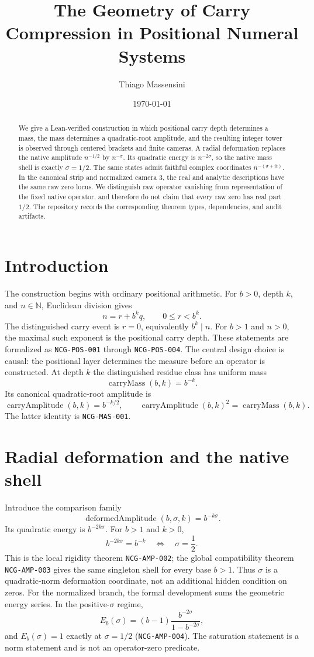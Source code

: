 \documentclass[11pt,a4paper]{article}
\title{The Geometry of Carry Compression in Positional Numeral Systems}
\author{Thiago Massensini}
\date{\today}
\begin{document}
\maketitle
\begin{abstract}
We give a Lean-verified construction in which positional carry depth determines a mass, the mass determines a quadratic-root amplitude, and the resulting integer tower is observed through centered brackets and finite cameras. A radial deformation replaces the native amplitude $n^{-1/2}$ by $n^{-\sigma}$. Its quadratic energy is $n^{-2\sigma}$, so the native mass shell is exactly $\sigma=1/2$. The same states admit faithful complex coordinates $n^{-(\sigma+it)}$. In the canonical strip and normalized camera $3$, the real and analytic descriptions have the same raw zero locus. We distinguish raw operator vanishing from representation of the fixed native operator, and therefore do not claim that every raw zero has real part $1/2$. The repository records the corresponding theorem types, dependencies, and audit artifacts.
\end{abstract}
\section{Introduction}
The construction begins with ordinary positional arithmetic. For $b>0$, depth $k$, and $n\in\mathbb N$, Euclidean division gives
\[ n=r+b^kq,\qquad 0\le r<b^k. \]
The distinguished carry event is $r=0$, equivalently $b^k\mid n$. For $b>1$ and $n>0$, the maximal such exponent is the positional carry depth. These statements are formalized as \texttt{NCG-POS-001} through \texttt{NCG-POS-004}.
The central design choice is causal: the positional layer determines the measure before an operator is constructed. At depth $k$ the distinguished residue class has uniform mass
\[ \operatorname{carryMass}(b,k)=b^{-k}. \]
Its canonical quadratic-root amplitude is
\[ \operatorname{carryAmplitude}(b,k)=b^{-k/2}, \qquad \operatorname{carryAmplitude}(b,k)^2=\operatorname{carryMass}(b,k). \]
The latter identity is \texttt{NCG-MAS-001}.
\section{Radial deformation and the native shell}
Introduce the comparison family
\[ \operatorname{deformedAmplitude}(b,\sigma,k)=b^{-k\sigma}. \]
Its quadratic energy is $b^{-2k\sigma}$. For $b>1$ and $k>0$,
\[ b^{-2k\sigma}=b^{-k}\quad\Longleftrightarrow\quad\sigma=\frac12. \]
This is the local rigidity theorem \texttt{NCG-AMP-002}; the global compatibility theorem \texttt{NCG-AMP-003} gives the same singleton shell for every base $b>1$. Thus $\sigma$ is a quadratic-norm deformation coordinate, not an additional hidden condition on zeros.
For the normalized branch, the formal development sums the geometric energy series. In the positive-$\sigma$ regime,
\[ E_b(\sigma)=(b-1)\frac{b^{-2\sigma}}{1-b^{-2\sigma}}, \]
and $E_b(\sigma)=1$ exactly at $\sigma=1/2$ (\texttt{NCG-AMP-004}). The saturation statement is a norm statement and is not an operator-zero predicate.
\end{document}
